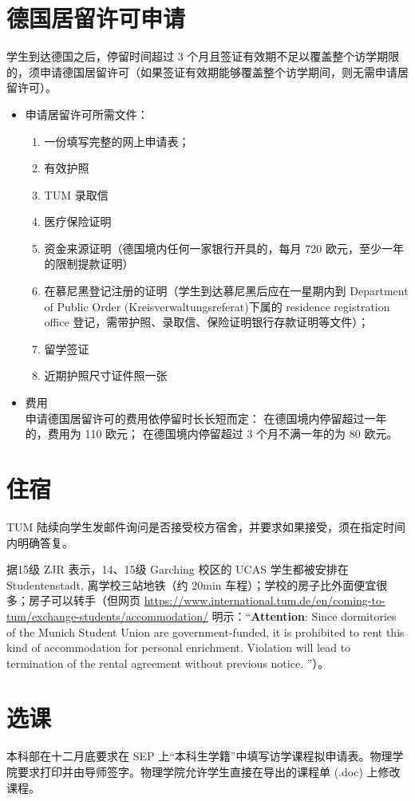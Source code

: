 \documentclass[oneside,final]{book}
\begin{document}
\chapter{德国居留许可申请}
学生到达德国之后，停留时间超过 3 个月且签证有效期不足以覆盖整个访学期限的，须申请德国居留许可（如果签证有效期能够覆盖整个访学期间，则无需申请居留许可）。
\begin{itemize}
\item 申请居留许可所需文件：
\begin{enumerate}
\item 一份填写完整的网上申请表；
\item 有效护照
\item TUM 录取信
\item 医疗保险证明
\item 资金来源证明（德国境内任何一家银行开具的，每月 720 欧元，至少一年的限制提款证明）
\item 在慕尼黑登记注册的证明（学生到达慕尼黑后应在一星期内到 Department of Public Order (Kreisverwaltungsreferat)下属的 residence registration office 登记，需带护照、录取信、保险证明银行存款证明等文件）；
\item 留学签证
\item 近期护照尺寸证件照一张
\end{enumerate}
\item 费用\\
申请德国居留许可的费用依停留时长长短而定：
在德国境内停留超过一年的，费用为 110 欧元；
在德国境内停留超过 3 个月不满一年的为 80 欧元。
\end{itemize}

\chapter{住宿}
TUM 陆续向学生发邮件询问是否接受校方宿舍，并要求如果接受，须在指定时间内明确答复。

据15级 ZJR 表示，14、15级 Garching 校区的 UCAS 学生都被安排在 Studentenstadt, 离学校三站地铁（约 20min 车程）；学校的房子比外面便宜很多；房子可以转手（但网页 \url{https://www.international.tum.de/en/coming-to-tum/exchange-students/accommodation/} 明示：``\textbf{Attention}: Since dormitories of the Munich Student Union are government-funded, it is prohibited to rent this kind of accommodation for personal enrichment. Violation will lead to termination of the rental agreement without previous notice. ''）。

\chapter{选课}
本科部在十二月底要求在 SEP 上“本科生学籍”中填写访学课程拟申请表。物理学院要求打印并由导师签字。物理学院允许学生直接在导出的课程单 (.doc) 上修改课程。
\end{document}
